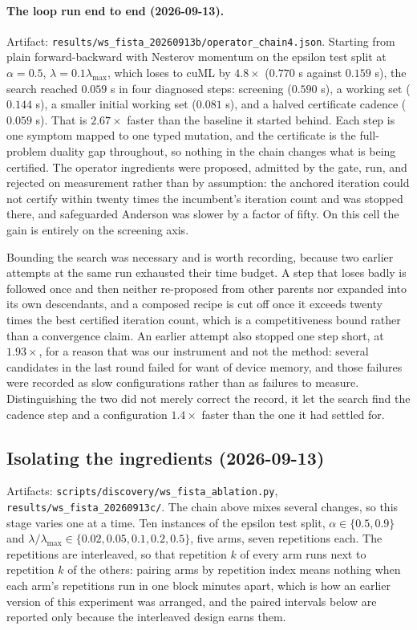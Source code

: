 \paragraph{The loop run end to end (2026-09-13).}
Artifact: \texttt{results/ws\_fista\_20260913b/operator\_chain4.json}. Starting from
plain forward-backward with Nesterov momentum on the epsilon test split at
$\alpha=0.5$, $\lambda=0.1\lambda_{\max}$, which loses to cuML by $4.8\times$
($0.770$ s against $0.159$ s), the search reached $0.059$ s in four diagnosed
steps: screening ($0.590$ s), a working set ($0.144$ s), a smaller initial
working set ($0.081$ s), and a halved certificate cadence ($0.059$ s). That is
$2.67\times$ faster than the baseline it started behind. Each step is one
symptom mapped to one typed mutation, and the certificate is the full-problem
duality gap throughout, so nothing in the chain changes what is being certified.
The operator ingredients were proposed, admitted by the gate, run, and rejected
on measurement rather than by assumption: the anchored iteration could not
certify within twenty times the incumbent's iteration count and was stopped
there, and safeguarded Anderson was slower by a factor of fifty. On this cell
the gain is entirely on the screening axis.

Bounding the search was necessary and is worth recording, because two earlier
attempts at the same run exhausted their time budget. A step that loses badly is
followed once and then neither re-proposed from other parents nor expanded into
its own descendants, and a composed recipe is cut off once it exceeds twenty
times the best certified iteration count, which is a competitiveness bound
rather than a convergence claim. An earlier attempt also stopped one step short,
at $1.93\times$, for a reason that was our instrument and not the method: several
candidates in the last round failed for want of device memory, and those
failures were recorded as slow configurations rather than as failures to
measure. Distinguishing the two did not merely correct the record, it let the
search find the cadence step and a configuration $1.4\times$ faster than the one
it had settled for.

\subsection{Isolating the ingredients (2026-09-13)}
\label{app:log:ablation}

Artifacts: \texttt{scripts/discovery/ws\_fista\_ablation.py},
\texttt{results/ws\_fista\_20260913c/}. The chain above mixes several changes, so
this stage varies one at a time. Ten instances of the epsilon test split,
$\alpha \in \{0.5, 0.9\}$ and $\lambda/\lambda_{\max} \in \{0.02, 0.05, 0.1, 0.2,
0.5\}$, five arms, seven repetitions each. The repetitions are interleaved, so
that repetition $k$ of every arm runs next to repetition $k$ of the others:
pairing arms by repetition index means nothing when each arm's repetitions run
in one block minutes apart, which is how an earlier version of this experiment
was arranged, and the paired intervals below are reported only because the
interleaved design earns them.

